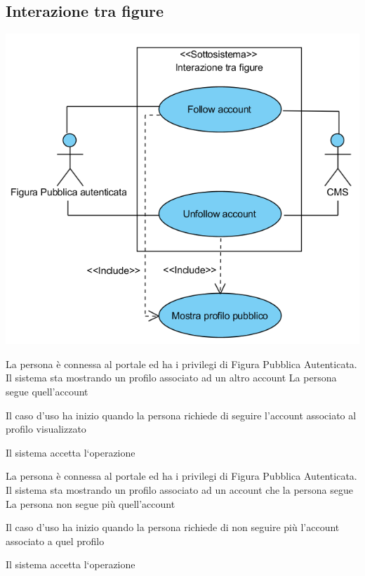 \subsection{Interazione tra figure}
\begin{center}
   \includegraphics[width=\textwidth]{assets/visualParadigm/cu/InterazioneTraFigure}
\end{center}
{}
{La persona è connessa al portale ed ha i privilegi di Figura Pubblica Autenticata. Il sistema sta mostrando un profilo associato ad un altro account}
{La persona segue quell'account}
{\begin{enumCU}
	\item Il caso d'uso ha inizio quando la persona richiede di seguire l'account associato al profilo visualizzato
	\item Il sistema accetta l`operazione
\end{enumCU}}


{}
{La persona è connessa al portale ed ha i privilegi di Figura Pubblica Autenticata. Il sistema sta mostrando un profilo associato ad un account che la persona segue}
{La persona non segue più quell'account}
{\begin{enumCU}
	\item Il caso d'uso ha inizio quando la persona richiede di non seguire più l'account associato a quel profilo
	\item Il sistema accetta l`operazione
\end{enumCU}}

